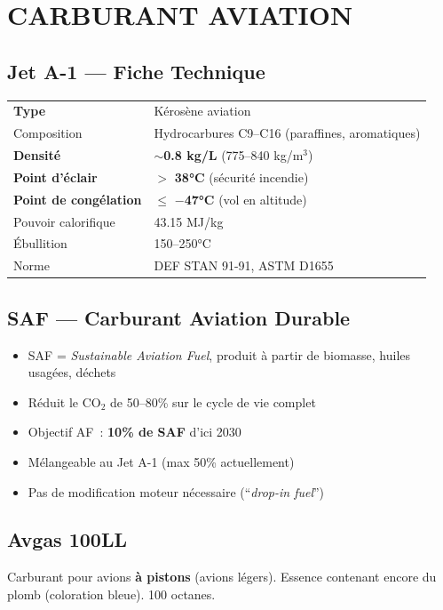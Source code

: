 \section{CARBURANT AVIATION}

\subsection{Jet A-1 --- Fiche Technique}

\begin{tabular}{p{4.5cm}p{10cm}}
\toprule
\textbf{Type} & Kérosène aviation \\
Composition & Hydrocarbures C9--C16 (paraffines, aromatiques) \\
\textbf{Densité} & $\sim$\textbf{0.8 kg/L} (775--840 kg/m$^3$) \\
\textbf{Point d'éclair} & $>$ \textbf{38°C} (sécurité incendie) \\
\textbf{Point de congélation} & $\leq$ \textbf{$-$47°C} (vol en altitude) \\
Pouvoir calorifique & 43.15 MJ/kg \\
Ébullition & 150--250°C \\
Norme & DEF STAN 91-91, ASTM D1655 \\
\bottomrule
\end{tabular}

\subsection{SAF --- Carburant Aviation Durable}
\begin{itemize}[nosep]
\item SAF = \textit{Sustainable Aviation Fuel}, produit à partir de biomasse, huiles usagées, déchets
\item Réduit le CO$_2$ de 50--80\% sur le cycle de vie complet
\item Objectif AF~: \textbf{10\% de SAF} d'ici 2030
\item Mélangeable au Jet A-1 (max 50\% actuellement)
\item Pas de modification moteur nécessaire (``\textit{drop-in fuel}'')
\end{itemize}

\subsection{Avgas 100LL}
Carburant pour avions \textbf{à pistons} (avions légers). Essence contenant encore du plomb (coloration bleue). 100 octanes.


